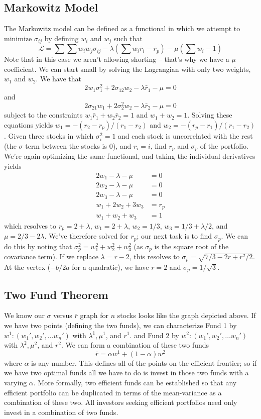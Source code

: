\documentclass[11pt]{article}
\theoremstyle{definition}
\begin{document}
\subsection{Markowitz Model}
The Markowitz model can be defined as a functional in which we attempt to minimize $\sigma_{ij}$ by defining $w_i$ and $w_j$ such that
$$\mathcal{L} = \sum \sum w_i w_j \sigma_{ij} - \lambda(\sum w_i \bar{r}_i - \bar{r}_p) - \mu (\sum w_i - 1)$$
Note that in this case we aren't allowing shorting -- that's why we have a $\mu$ coefficient. We can start small by solving the Lagrangian with only two weights, $w_1$ and $w_2$. We have that $$2w_1 \sigma_1^2 + 2 \sigma_{12}w_2 - \lambda \bar{r}_1 - \mu = 0$$ and $$2 \sigma_{21} w_1 + 2\sigma_2^2 w_2 - \lambda \bar{r}_2 - \mu = 0$$subject to the constraints $w_1 \bar{r}_1 + w_2 \bar{r}_2 = 1$ and $w_1 + w_2 = 1$. Solving these equations yields $w_1 = - (r_2 - r_p) / (r_1 - r_2)$ and $w_2 = - (r_p - r_1) / (r_1 - r_2)$. 
\example Given three stocks in which $\sigma_i^2 = 1$ and each stock is uncorrelated with the rest (the $\sigma$ term between the stocks is 0), and $r_i = i$, find $r_p$ and $\sigma_p$ of the portfolio. We're again optimizing the same functional, and taking the individual derivatives yields 
\begin{align*}
2w_1 - \lambda - \mu &= 0 \\
2w_2 - \lambda - \mu &= 0 \\
2w_3 - \lambda - \mu &= 0 \\
w_1 + 2w_2 + 3w_3 &= r_p \\
w_1 + w_2 + w_3 &= 1
\end{align*}
which resolves to $r_p = 2+\lambda$, $w_1 = 2+\lambda$, $w_2 = 1/3$, $w_3 = 1/3 + \lambda/2$, and $\mu = 2/3 - 2\lambda$. We've therefore solved for $r_p$; our next task is to find $\sigma_p$. We can do this by noting that $\sigma_p^2 =w_1^2 + w_2^2 + w_3^2$ (as $\sigma_p$ is the square root of the covariance term). If we replace $\lambda = r - 2$, this resolves to $\sigma_p = \sqrt{7/3 - 2r + r^2/2}$. At the vertex ($-b/2a$ for a quadratic), we have $r = 2$ and $\sigma_p = 1/\sqrt{3}$.   
\subsection{Two Fund Theorem}
We know our $\sigma$ versus $\bar{r}$ graph for $n$ stocks looks like the graph depicted above. If we have two points (defining the two funds), we can characterize Fund 1 by $w^1 : (w_1', w_2', \dots w_n')$ with $\lambda^1, \mu^1$, and $r^1$. and Fund 2 by $w^2 : (w_1', w_2', \dots w_n')$ with $\lambda^2, \mu^2$, and $r^2$. We can form a combination of these two funds $$\bar{r} = \alpha w^1+ (1-\alpha)w^2$$where $\alpha$ is any number. This defines all of the points on the efficient frontier; so if we have two optimal funds all we have to do is invest in those two funds with a varying $\alpha$. More formally, two efficient funds can be established so that any efficient portfolio can be duplicated in terms of the mean-variance as a combination of these two. All investors seeking efficient portfolios need only invest in a combination of two funds. 
\end{document}

